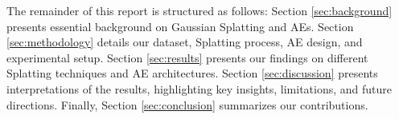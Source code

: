 The remainder of this report is structured as follows: Section \ref{sec:background} presents essential background on Gaussian Splatting and AEs. Section \ref{sec:methodology} details our dataset, Splatting process, AE design, and experimental setup. Section \ref{sec:results} presents our findings on different Splatting techniques and AE architectures. Section \ref{sec:discussion} presents interpretations of the results, highlighting key insights, limitations, and future directions. Finally, Section \ref{sec:conclusion} summarizes our contributions.  
